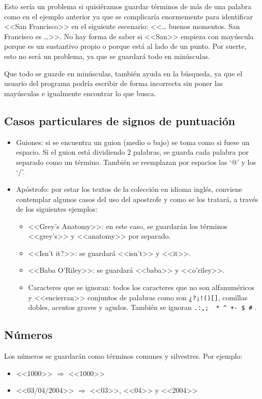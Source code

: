 Esto sería un problema si quisiéramos guardar términos de más de una palabra como en el ejemplo anterior ya que se complicaría enormemente para identificar <<San Francisco>> en el siguiente escenario: <<… buenos momentos. San Francisco es …>>. No hay forma de saber si <<San>> empieza con mayúscula porque es un sustantivo propio o porque está al lado de un punto. Por suerte, esto no será un problema, ya que se guardará todo en minúsculas.

Que todo se guarde en minúsculas, también ayuda en la búsqueda, ya que el usuario del programa podría escribir de forma incorrecta sin poner las mayúsculas e igualmente encontrar lo que busca.

 
 
\subsection{Casos particulares de signos de puntuación}
 
\begin{itemize}

\item Guiones: si se encuentra un guion (medio o bajo) se toma como si fuese un espacio. Si el guion está dividiendo 2 palabras, se guarda cada palabra por separado como un término. También se reemplazan por espacios las ‘@’ y los ‘/’.

\item Apóstrofo: por estar los textos de la colección en idioma inglés, conviene contemplar algunos casos del uso del apostrofe y como se los tratará, a través de los siguientes ejemplos:
\begin{itemize}

\item  <<Grey’s Anatomy>>: en este caso, se guardarán los términos <<grey's>> y <<anatomy>> por separado.
\item  <<Isn’t it?>>: se guardará <<isn't>> y <<it>>.
\item  <<Baba O’Riley>>:  se guardará <<baba>> y <<o'riley>>.
\item  Caracteres que se ignoran: todos los caracteres que no son alfanuméricos y <<encierran>> conjuntos de palabras como son \texttt{¿?¡!()[]{}}, comillas dobles, acentos graves y agudos.
También se ignoran \texttt{.:,;~ * \^{} +- \$ \#} .

\end{itemize}

\end{itemize}

\subsection{Números}

Los números se guardarán como términos comunes y silvestres. Por ejemplo:

\begin{itemize}
\item <<1000>> $\Longrightarrow$ <<1000>>
\item <<03/04/2004>> $\Longrightarrow$ <<03>>, <<04>> y <<2004>>
\end{itemize}
